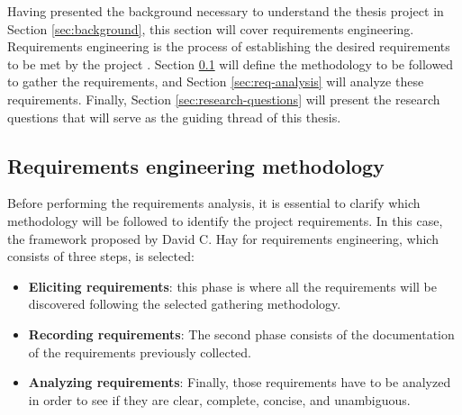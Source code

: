\documentclass[english, 12pt, a4paper, sci, utf8, a-1b, online]{aaltothesis}
\begin{document}



Having presented the background necessary to understand the thesis project in Section \ref{sec:background}, this section will cover requirements engineering.\\

Requirements engineering is the process of establishing the desired requirements to be met by the project \cite{hay2003requirements}. Section \ref{sec:req-methodology} will define the methodology to be followed to gather the requirements, and Section \ref{sec:req-analysis} will analyze these requirements. Finally, Section \ref{sec:research-questions} will present the research questions that will serve as the guiding thread of this thesis.

\subsection{Requirements engineering methodology}
\label{sec:req-methodology}

Before performing the requirements analysis, it is essential to clarify which methodology will be followed to identify the project requirements. In this case, the framework proposed by David C. Hay \cite{hay2003requirements} for requirements engineering, which consists of three steps, is selected:

\begin{itemize}
    \item \textbf{Eliciting requirements}: this phase is where all the requirements will be discovered following the selected gathering methodology.
    \item \textbf{Recording requirements}: The second phase consists of the documentation of the requirements previously collected.
    \item \textbf{Analyzing requirements}: Finally, those requirements have to be analyzed in order to see if they are clear, complete, concise, and unambiguous.
\end{itemize}
\end{document}
